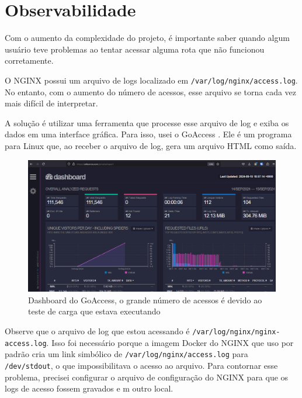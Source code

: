 \chapter{Observabilidade}

Com o aumento da complexidade do projeto, é importante saber quando algum usuário teve problemas ao 
tentar acessar alguma rota que não funcionou corretamente.

O NGINX possui um arquivo de logs localizado em \verb|/var/log/nginx/access.log|. No entanto, com o 
aumento do número de acessos, esse arquivo se torna cada vez mais difícil de interpretar.

A solução é utilizar uma ferramenta que processe esse arquivo de log e exiba os dados em uma 
interface gráfica. Para isso, usei o GoAccess \cite{goaccess}. Ele é um programa para Linux que, 
ao receber o arquivo de log, gera um arquivo HTML como saída.




\begin{figure}[ht]
    \begin{center}
    \includegraphics[width=400pt]{img/dashboard.png}
    \caption{Dashboard do GoAccess, o grande número de acessos é devido ao teste de carga que estava executando}
    \label{fig:cloudflare-stat.png}
    \end{center}
\end{figure}

Observe que o arquivo de log que estou acessando é \verb|/var/log/nginx/nginx-access.log|. Isso foi 
necessário porque a imagem Docker do NGINX que uso por padrão cria um link simbólico de \verb|/var/log/nginx/access.log| 
para \verb|/dev/stdout|, o que impossibilitava o acesso ao arquivo. Para contornar esse problema, 
precisei configurar o arquivo de configuração do NGINX para que os logs de acesso fossem gravados e
m outro local.

